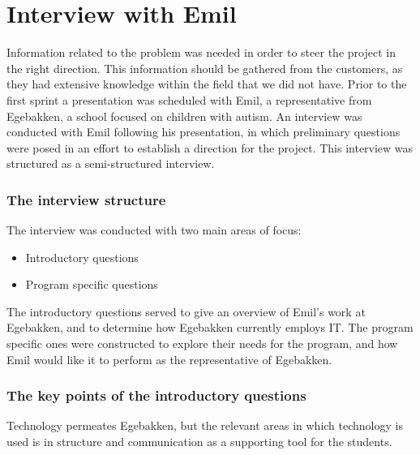 \section{Interview with Emil}\label{interview-with-emil}
Information related to the problem was needed in order to steer the project in the right direction.
This information should be gathered from the customers, as they had extensive knowledge within the field that we did not have.
Prior to the first sprint a presentation was scheduled with Emil, a representative from Egebakken, a school focused on children with autism.
An interview was conducted with Emil following his presentation, in which preliminary questions were posed in an effort to establish a direction for the project.
This interview was structured as a semi-structured interview.

\subsubsection{The interview structure}
The interview was conducted with two main areas of focus:
\begin{itemize}
    \item Introductory questions
    \item Program specific questions
\end{itemize}
\noindent
The introductory questions served to give an overview of Emil's work at Egebakken, and to determine how Egebakken currently employs IT.
The program specific ones were constructed to explore their needs for the program, and how Emil would like it to perform as the representative of Egebakken.

\subsubsection{The key points of the introductory questions}
Technology permeates Egebakken, but the relevant areas in which technology is used is in structure and communication as a supporting tool for the students.

